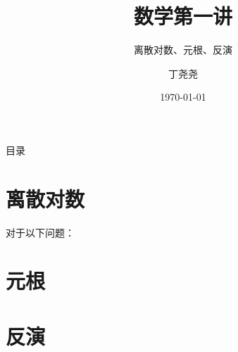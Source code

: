 \documentclass{beamer}
\title{数学第一讲}
\subtitle{离散对数、元根、反演}
\author{丁尧尧}
\institute{上海交通大学}
\date{\today}
\begin{document}
	\maketitle
	\begin{frame}{目录}
		\tableofcontents
	\end{frame}
	
	\section{离散对数}
		对于以下问题：
		\begin{theorem}
		\end{theorem}
	\section{元根}
	\section{反演}
\end{document}
